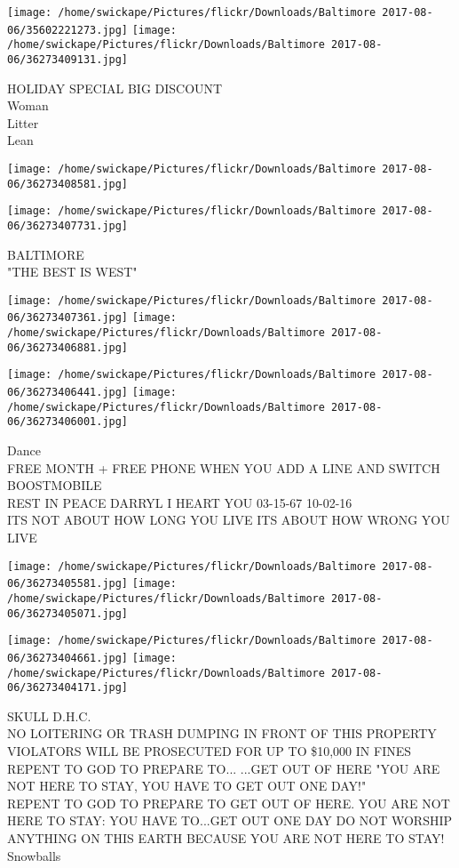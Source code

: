 \documentclass[10pt,letterpaper]{article}
\begin{document}
\texttt{[image: /home/swickape/Pictures/flickr/Downloads/Baltimore 2017-08-06/35602221273.jpg]}
\texttt{[image: /home/swickape/Pictures/flickr/Downloads/Baltimore 2017-08-06/36273409131.jpg]}

HOLIDAY SPECIAL BIG DISCOUNT\\
Woman\\
Litter\\
Lean
\pagebreak

\texttt{[image: /home/swickape/Pictures/flickr/Downloads/Baltimore 2017-08-06/36273408581.jpg]}

\vspace{0.25in}
\texttt{[image: /home/swickape/Pictures/flickr/Downloads/Baltimore 2017-08-06/36273407731.jpg]}

BALTIMORE\\
"THE BEST IS WEST"
\pagebreak

\texttt{[image: /home/swickape/Pictures/flickr/Downloads/Baltimore 2017-08-06/36273407361.jpg]}
\texttt{[image: /home/swickape/Pictures/flickr/Downloads/Baltimore 2017-08-06/36273406881.jpg]}

\texttt{[image: /home/swickape/Pictures/flickr/Downloads/Baltimore 2017-08-06/36273406441.jpg]}
\texttt{[image: /home/swickape/Pictures/flickr/Downloads/Baltimore 2017-08-06/36273406001.jpg]}

Dance\\
FREE MONTH + FREE PHONE WHEN YOU ADD A LINE AND SWITCH BOOSTMOBILE\\
REST IN PEACE DARRYL I HEART YOU 03{-}15{-}67 10{-}02{-}16\\
ITS NOT ABOUT HOW LONG YOU LIVE ITS ABOUT HOW WRONG YOU LIVE
\pagebreak

\texttt{[image: /home/swickape/Pictures/flickr/Downloads/Baltimore 2017-08-06/36273405581.jpg]}
\texttt{[image: /home/swickape/Pictures/flickr/Downloads/Baltimore 2017-08-06/36273405071.jpg]}

\texttt{[image: /home/swickape/Pictures/flickr/Downloads/Baltimore 2017-08-06/36273404661.jpg]}
\texttt{[image: /home/swickape/Pictures/flickr/Downloads/Baltimore 2017-08-06/36273404171.jpg]}

SKULL D.H.C.\\
NO LOITERING OR TRASH DUMPING IN FRONT OF THIS PROPERTY VIOLATORS WILL BE PROSECUTED FOR UP TO \$10,000 IN FINES REPENT TO GOD TO PREPARE TO... ...GET OUT OF HERE "YOU ARE NOT HERE TO STAY, YOU HAVE TO GET OUT ONE DAY!"\\
REPENT TO GOD TO PREPARE TO GET OUT OF HERE.  YOU ARE NOT HERE TO STAY: YOU HAVE TO...GET OUT ONE DAY DO NOT WORSHIP ANYTHING ON THIS EARTH BECAUSE YOU ARE NOT HERE TO STAY!\\
Snowballs
\pagebreak
\end{document}
